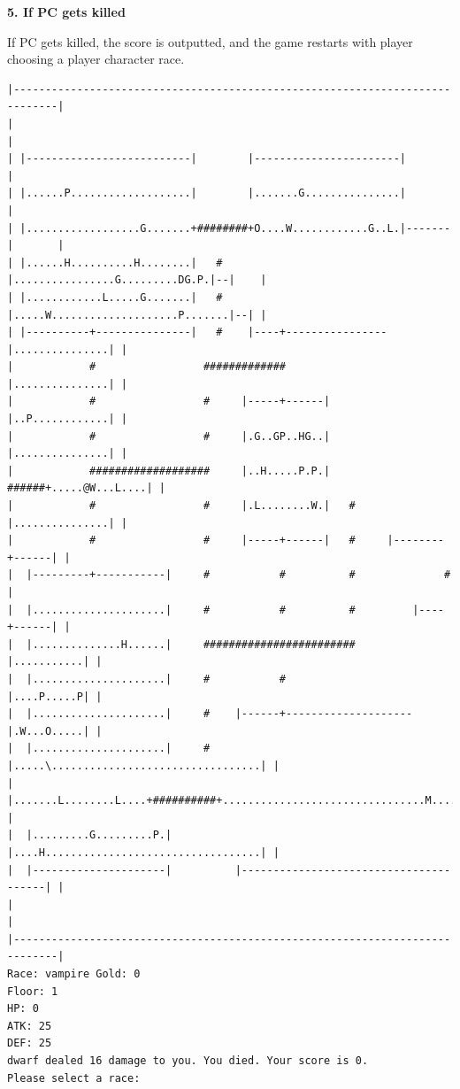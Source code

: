 \documentclass[11pt]{article}
\theoremstyle{plain}
\begin{document}
\newpage
\textbf{5. If PC gets killed}

If PC gets killed, the score is outputted, and the game restarts with
player choosing a player character race.
\begin{Verbatim}[fontsize=\scriptsize]
|-----------------------------------------------------------------------------|
|                                                                             |
| |--------------------------|        |-----------------------|               |
| |......P...................|        |.......G...............|               |
| |..................G.......+########+O....W............G..L.|-------|       |
| |......H..........H........|   #    |................G.........DG.P.|--|    |
| |............L.....G.......|   #    |.....W....................P.......|--| |
| |----------+---------------|   #    |----+----------------|...............| |
|            #                 #############                |...............| |
|            #                 #     |-----+------|         |..P............| |
|            #                 #     |.G..GP..HG..|         |...............| |
|            ###################     |..H.....P.P.|   ######+.....@W...L....| |
|            #                 #     |.L........W.|   #     |...............| |
|            #                 #     |-----+------|   #     |--------+------| |
|  |---------+-----------|     #           #          #              #        |
|  |.....................|     #           #          #         |----+------| |
|  |..............H......|     ########################         |...........| |
|  |.....................|     #           #                    |....P.....P| |
|  |.....................|     #    |------+--------------------|.W...O.....| |
|  |.....................|     #    |.....\.................................| |
|  |.......L........L....+##########+................................M......| |
|  |.........G.........P.|          |....H..................................| |
|  |---------------------|          |---------------------------------------| |
|                                                                             |
|-----------------------------------------------------------------------------|
Race: vampire Gold: 0                                                  Floor: 1
HP: 0
ATK: 25
DEF: 25
dwarf dealed 16 damage to you. You died. Your score is 0. 
Please select a race:
\end{Verbatim}
\end{document}
